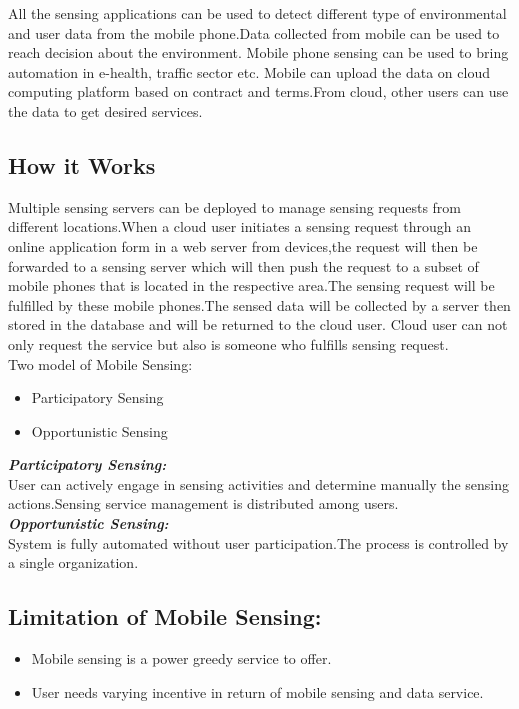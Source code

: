 \documentclass {report}
\begin{document}
All the sensing applications can be used to detect different type of environmental and user data from the mobile phone.Data collected from mobile can be used to reach decision about the environment.
Mobile phone sensing can be used to bring automation in e-health, traffic sector etc.
Mobile can upload the data on cloud computing platform based on contract and terms.From cloud, other users can use the data to get desired services.\\

\subsection{How it Works}
Multiple sensing servers can be deployed to manage sensing requests from different locations.When a cloud user initiates a sensing request through an online
application form in a web server from devices,the request will then be forwarded to a sensing server which will then push the request to a subset
of mobile phones that is located in the respective area.The sensing request will be fulfilled by these mobile phones.The sensed data will be collected by a server then stored in the database and will be returned to the cloud user.
Cloud user can not only request the service but also is someone who fulfills sensing request.\\

Two model of Mobile Sensing:
\begin{itemize}
\item Participatory Sensing
\item Opportunistic Sensing
\end{itemize}

{\bfseries \emph{Participatory Sensing:}\\}
	User can actively engage in sensing activities and determine manually the sensing actions.Sensing service management is distributed among users.\\
{\bfseries \emph{Opportunistic Sensing:}\\}
	System is fully automated without user participation.The process is controlled by a single organization.\\

\subsection{Limitation of Mobile Sensing:}
\begin{itemize}
\item Mobile sensing is a power greedy service to offer.
\item User needs varying incentive in return of mobile sensing and data service.
\end{itemize}
\end{document}
